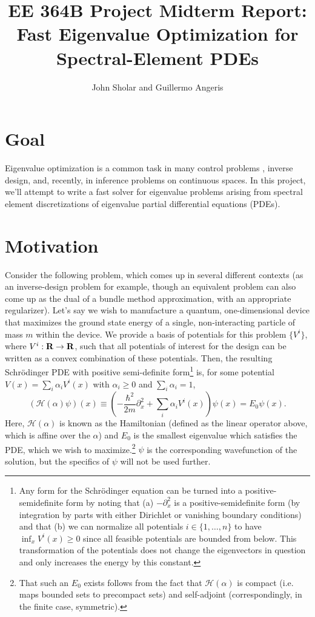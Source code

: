 \documentclass[11pt]{article}
\title{EE 364B Project Midterm Report: \\ Fast Eigenvalue Optimization for Spectral-Element PDEs}
\author{John Sholar and Guillermo Angeris}
\newcommand{\haml}{\mathcal{H}}
\begin{document}
\maketitle

\section{Goal}
Eigenvalue optimization is a common task in many control problems \cite{boyd1994linear}, inverse design, and, recently, in inference problems on continuous spaces. In this project, we'll attempt to write a fast solver for eigenvalue problems arising from spectral element discretizations of eigenvalue partial differential equations (PDEs).

\section{Motivation}\label{sec:motivation}
Consider the following problem, which comes up in several different contexts (as an inverse-design problem for example, though an equivalent problem can also come up as the dual of a bundle method approximation, with an appropriate regularizer). Let's say we wish to manufacture a quantum, one-dimensional device that maximizes the ground state energy of a single, non-interacting particle of mass $m$ within the device. We provide a basis of potentials for this problem $\{V^i\}$, where $V^i: {\mbox{\bf R}}\to {\mbox{\bf R}}$, such that all potentials of interest for the design can be written as a convex combination of these potentials. Then, the resulting Schr\"odinger PDE with positive semi-definite form\footnote{Any form for the Schr\"odinger equation can be turned into a positive-semidefinite form by noting that (a) $-\partial_x^2$ is a positive-semidefinite form (by integration by parts with either Dirichlet or vanishing boundary conditions) and that (b) we can normalize all potentials $i\in\{1,\dots,n\}$ to have $\inf_x V^i(x) \ge 0$ since all feasible potentials are bounded from below. This transformation of the potentials does not change the eigenvectors in question and only increases the energy by this constant.} is, for some potential $V(x) = \sum_i \alpha_i V^i(x)$ with $\alpha_i \ge 0$ and $\sum_i \alpha_i = 1$,
\[
(\haml(\alpha) \psi)(x) \equiv \left(- \frac{\hbar^2}{2m}\partial_x^2 + \sum_i \alpha_i V^i(x)\right)\psi(x)  = E_0 \psi(x).
\]
Here, $\haml(\alpha)$ is known as the Hamiltonian (defined as the linear operator above, which is affine over the $\alpha$) and $E_0$ is the smallest eigenvalue which satisfies the PDE, which we wish to maximize.\footnote{That such an $E_0$ exists follows from the fact that $\haml(\alpha)$ is compact (i.e. maps bounded sets to precompact sets) and self-adjoint (correspondingly, in the finite case, symmetric).} $\psi$ is the corresponding wavefunction of the solution, but the specifics of $\psi$ will not be used further.
\end{document}
